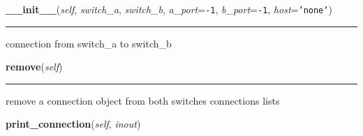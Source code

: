     \vspace{0.5ex}

\hspace{.8\funcindent}\begin{boxedminipage}{\funcwidth}

    \raggedright \textbf{\_\_init\_\_}(\textit{self}, \textit{switch\_a}, \textit{switch\_b}, \textit{a\_port}={\tt -1}, \textit{b\_port}={\tt -1}, \textit{host}={\tt \texttt{'}\texttt{none}\texttt{'}})

    \vspace{-1.5ex}

    \rule{\textwidth}{0.5\fboxrule}
\setlength{\parskip}{2ex}
    connection from switch\_a to switch\_b

\setlength{\parskip}{1ex}
    \end{boxedminipage}

    \label{Data_Plane_DHT:connection:remove}

    \vspace{0.5ex}

\hspace{.8\funcindent}\begin{boxedminipage}{\funcwidth}

    \raggedright \textbf{remove}(\textit{self})

    \vspace{-1.5ex}

    \rule{\textwidth}{0.5\fboxrule}
\setlength{\parskip}{2ex}
    remove a connection object from both switches connections lists

\setlength{\parskip}{1ex}
    \end{boxedminipage}

    \label{Data_Plane_DHT:connection:print_connection}

    \vspace{0.5ex}

\hspace{.8\funcindent}\begin{boxedminipage}{\funcwidth}

    \raggedright \textbf{print\_connection}(\textit{self}, \textit{inout})

\setlength{\parskip}{2ex}
\setlength{\parskip}{1ex}
    \end{boxedminipage}


